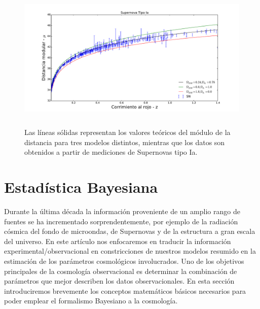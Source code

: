 \documentclass[10.5pt,prb,
               showpacs,            %
               preprintnumbers,     %
               aps,                 %
               prl,          	    %
               letterpaper,             %
               superscriptaddress,      %
               nofootinbib,         %
               tightenlines,        %
               floats,floatfix      %
               ,usenatbib]{revtex4-1}%
\begin{document}
\begin{figure}[th]
\begin{center}
\includegraphics[trim =  0mm  0mm 0mm 0mm, clip, width=14cm, height=7cm]{SN_models.pdf} 
\end{center}
\caption[Geometries of the spacetime]
{Las l\'ineas s\'olidas representan los valores te\'oricos del m\'odulo de la distancia para tres modelos distintos,
mientras que los datos son obtenidos a partir de mediciones de Supernovas tipo Ia.}
\label{Fig:SNs}
\end{figure}


\section{Estad\'istica Bayesiana}



Durante la \'ultima d\'ecada la informaci\'on proveniente de un amplio rango de fuentes se ha incrementado sorprendentemente,
por ejemplo de la radiaci\'on c\'osmica del fondo de microondas, de Supernovas y de la estructura a gran escala del universo.
En este art\'iculo nos enfocaremos en traducir la informaci\'on experimental/observacional en constricciones de nuestros modelos 
resumido en la estimaci\'on de los par\'ametros cosmol\'ogicos involucrados.
Uno de los objetivos principales de la cosmolog\'ia observacional es determinar 
la combinaci\'on de par\'ametros que mejor describen los datos observacionales.
En esta secci\'on introduciremos brevemente los conceptos matem\'aticos b\'asicos 
necesarios para poder emplear el formalismo Bayesiano a la cosmolog\'ia. 
\\
\end{document}
